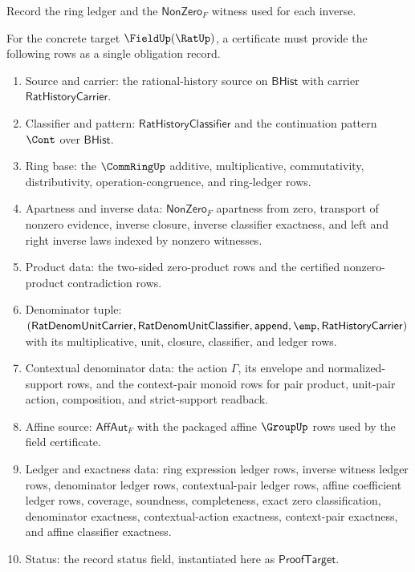 \begin{definition}
\label{def:field-ledger-policy}
Record the ring ledger and the $\mathsf{NonZero}_F$ witness used for each inverse.
\end{definition}

\begin{definition}
\label{def:field-certificate-obligations}
For the concrete target $\FieldUp(\RatUp)$, a certificate must provide the
following rows as a single obligation record.
\begin{enumerate}
  \item Source and carrier: the rational-history source on
  $\mathsf{BHist}$ with carrier $\mathsf{RatHistoryCarrier}$.
  \item Classifier and pattern: $\mathsf{RatHistoryClassifier}$ and the
  continuation pattern $\Cont$ over $\mathsf{BHist}$.
  \item Ring base: the $\CommRingUp$ additive, multiplicative,
  commutativity, distributivity, operation-congruence, and ring-ledger rows.
  \item Apartness and inverse data: $\mathsf{NonZero}_F$ apartness from zero,
  transport of nonzero evidence, inverse closure, inverse classifier
  exactness, and left and right inverse laws indexed by nonzero witnesses.
  \item Product data: the two-sided zero-product rows and the certified
  nonzero-product contradiction rows.
  \item Denominator tuple:
  $(\mathsf{RatDenomUnitCarrier},\mathsf{RatDenomUnitClassifier},
  \mathsf{append},\emp,\mathsf{RatHistoryCarrier})$ with its multiplicative,
  unit, closure, classifier, and ledger rows.
  \item Contextual denominator data: the action $\Gamma$, its envelope and
  normalized-support rows, and the context-pair monoid rows for pair product,
  unit-pair action, composition, and strict-support readback.
  \item Affine source: $\mathsf{AffAut}_F$ with the packaged affine
  $\GroupUp$ rows used by the field certificate.
  \item Ledger and exactness data: ring expression ledger rows, inverse
  witness ledger rows, denominator ledger rows, contextual-pair ledger rows,
  affine coefficient ledger rows, coverage, soundness, completeness, exact
  zero classification, denominator exactness, contextual-action exactness,
  context-pair exactness, and affine classifier exactness.
  \item Status: the record status field, instantiated here as
  $\mathsf{ProofTarget}$.
\end{enumerate}
\end{definition}

